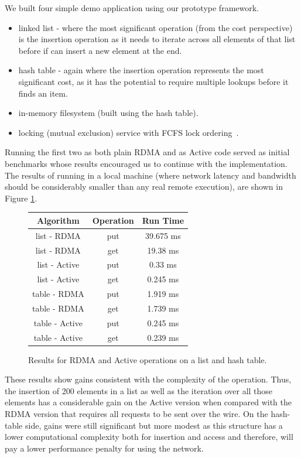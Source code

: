 \documentclass[10pt]{article}
\begin{document}
We built four simple demo application using our prototype framework. 
\begin{itemize}
\item linked list - where the most significant operation (from the cost perspective) is the insertion operation as it needs to iterate across all elements of that list before if can insert a new element at the end.
\item hash table - again where the insertion operation represents the most significant cost, as it has the potential to require multiple lookups before it finds an item.
\item in-memory filesystem (built using the hash table).
\item locking (mutual exclusion) service with FCFS lock ordering~\cite{nic-basedatomic}.  
\end{itemize}

Running the first two as both plain RDMA and as Active code served as initial benchmarks whose results encouraged us to continue with the implementation. The results of running in a local machine (where network latency and bandwidth should be considerably smaller than any real remote execution), are shown in Figure \ref{res1}.

\begin{figure}[h!]
\center
\begin{tabular}{|ccc|}
\hline
Algorithm & Operation & Run Time\\
\hline
list - RDMA &  put & 39.675 ms \\
list - RDMA & get & 19.38 ms \\
\hline
list - Active & put & 0.33 ms \\
list - Active & get & 0.245 ms \\
\hline
\hline
table - RDMA  & put & 1.919 ms\\
table - RDMA   & get & 1.739 ms\\
\hline
table - Active  &put & 0.245 ms\\
table - Active & get & 0.239 ms\\
\hline
\end{tabular}
\caption{Results for RDMA and Active operations on a list and hash table.}
\label{res1}
\end{figure}

These results show gains consistent with the complexity of the operation. Thus, the insertion of 200 elements in a list as well as the iteration over all those elements has a considerable gain on the Active version when compared with the RDMA version that requires all requests to be sent over the wire. On the hash-table side, gains were still significant but more modest as this structure has a lower computational complexity both for insertion and access and therefore, will pay a lower performance penalty for using the network. 
\end{document}
